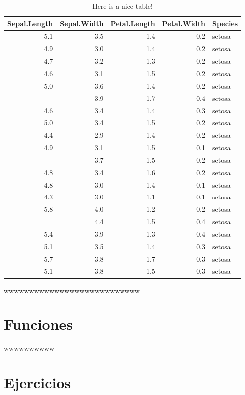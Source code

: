 \documentclass[
  16pt,
]{krantz}
\theoremstyle{definition}
\theoremstyle{definition}
\theoremstyle{definition}
\theoremstyle{definition}
\theoremstyle{remark}
\begin{document}
\begin{table}

\caption{\label{tab:nice-tab}Here is a nice table!}
\centering
\begin{tabular}[t]{rrrrl}
\toprule
Sepal.Length & Sepal.Width & Petal.Length & Petal.Width & Species\\
\midrule
5.1 & 3.5 & 1.4 & 0.2 & setosa\\
4.9 & 3.0 & 1.4 & 0.2 & setosa\\
4.7 & 3.2 & 1.3 & 0.2 & setosa\\
4.6 & 3.1 & 1.5 & 0.2 & setosa\\
5.0 & 3.6 & 1.4 & 0.2 & setosa\\
\addlinespace
5.4 & 3.9 & 1.7 & 0.4 & setosa\\
4.6 & 3.4 & 1.4 & 0.3 & setosa\\
5.0 & 3.4 & 1.5 & 0.2 & setosa\\
4.4 & 2.9 & 1.4 & 0.2 & setosa\\
4.9 & 3.1 & 1.5 & 0.1 & setosa\\
\addlinespace
5.4 & 3.7 & 1.5 & 0.2 & setosa\\
4.8 & 3.4 & 1.6 & 0.2 & setosa\\
4.8 & 3.0 & 1.4 & 0.1 & setosa\\
4.3 & 3.0 & 1.1 & 0.1 & setosa\\
5.8 & 4.0 & 1.2 & 0.2 & setosa\\
\addlinespace
5.7 & 4.4 & 1.5 & 0.4 & setosa\\
5.4 & 3.9 & 1.3 & 0.4 & setosa\\
5.1 & 3.5 & 1.4 & 0.3 & setosa\\
5.7 & 3.8 & 1.7 & 0.3 & setosa\\
5.1 & 3.8 & 1.5 & 0.3 & setosa\\
\bottomrule
\end{tabular}
\end{table}

wwwwwwwwwwwwwwwwwwwwwwwwwww

\hypertarget{funciones}{%
\section{Funciones}\label{funciones}}

wwwwwwwwww \citep{vincze2014college}

\hypertarget{ejercicios-1}{%
\section{Ejercicios}\label{ejercicios-1}}
\end{document}
